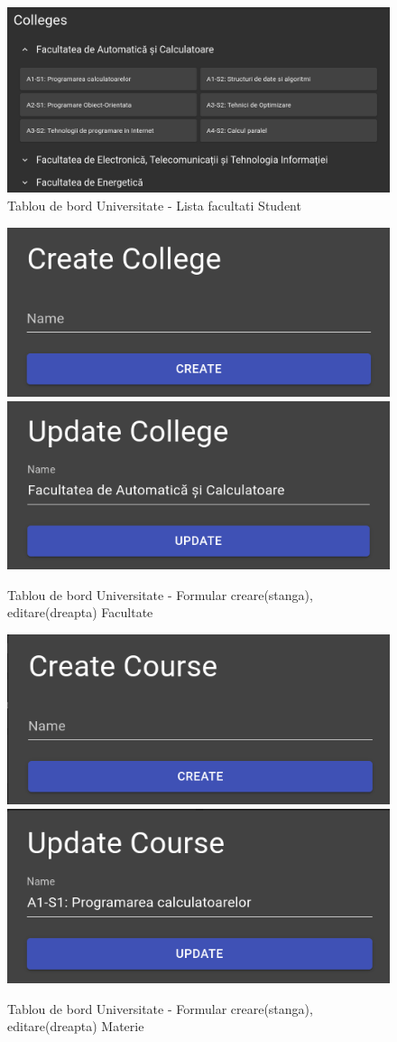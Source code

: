 \documentclass[12pt, a4paper, oneside, romanian]{teza-upb}
\begin{document}
\begin{figure}[H]
\centering
\includegraphics*[width=\columnwidth]{tablou-de-bord-universitate-lista-facultati-student}
\caption{Tablou de bord Universitate - Lista facultati Student}
\label{tablou-de-bord-universitate-lista-facultati-student}
\end{figure}

\begin{figure}[H]
\centering
\includegraphics*[width=0.45\columnwidth]{tablou-de-bord-universitate-formular-creare-facultate}
\includegraphics*[width=0.45\columnwidth]{tablou-de-bord-universitate-formular-editare-facultate}
\caption{Tablou de bord Universitate - Formular creare(stanga), editare(dreapta) Facultate}
\label{tablou-de-bord-universitate-formular-facultate}
\end{figure}

\begin{figure}[H]
\centering
\includegraphics*[width=0.45\columnwidth]{tablou-de-bord-universitate-formular-creare-materie}
\includegraphics*[width=0.45\columnwidth]{tablou-de-bord-universitate-formular-editare-materie}
\caption{Tablou de bord Universitate - Formular creare(stanga), editare(dreapta) Materie}
\label{tablou-de-bord-universitate-formular-materie}
\end{figure}
\end{document}
